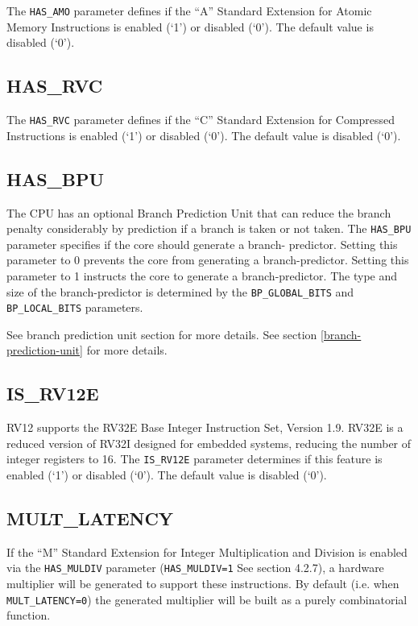The \texttt{HAS\_AMO} parameter defines if the ``A'' Standard Extension for
Atomic Memory Instructions is enabled (`1') or disabled (`0'). The
default value is disabled (`0').

\subsection{HAS\_RVC}\label{has_rvc}

The \texttt{HAS\_RVC} parameter defines if the ``C'' Standard Extension for
Compressed Instructions is enabled (`1') or disabled (`0'). The default
value is disabled (`0').

\subsection{HAS\_BPU}\label{has_bpu}

The CPU has an optional Branch Prediction Unit that can reduce the branch
penalty considerably by prediction if a branch is taken or not taken. The
\texttt{HAS\_BPU} parameter specifies if the core should generate a branch-
predictor. Setting this parameter to 0 prevents the core from generating a
branch-predictor. Setting this parameter to 1 instructs the core to generate a
branch-predictor. The type and size of the branch-predictor is determined by the
\texttt{BP\_GLOBAL\_BITS} and \texttt{BP\_LOCAL\_BITS} parameters.

\ifdefined\MARKDOWN
See branch prediction unit section for more details.
\else
See section \ref{branch-prediction-unit}  for more details.
\fi

\subsection{IS\_RV12E}\label{is_rv12e}

RV12 supports the RV32E Base Integer Instruction Set, Version 1.9. RV32E is a
reduced version of RV32I designed for embedded systems, reducing the number of
integer registers to 16. The \texttt{IS\_RV12E} parameter determines if this
feature is enabled (`1') or disabled (`0'). The default value is disabled (`0').

\subsection{MULT\_LATENCY}\label{mult_latency}

If the ``M'' Standard Extension for Integer Multiplication and Division is
enabled via the \texttt{HAS\_MULDIV} parameter (\texttt{HAS\_MULDIV=1} See
section 4.2.7), a hardware multiplier will be generated to support these
instructions. By default (i.e. when \texttt{MULT\_LATENCY=0}) the generated
multiplier will be built as a purely combinatorial function.

